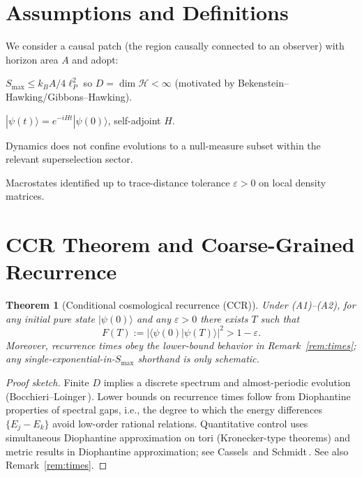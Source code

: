 \documentclass[12pt]{article}
\newcommand{\Smax}{S_{\max}}
\newtheorem{theorem}{Theorem}
\theoremstyle{remark}
\begin{document}
\section{Assumptions and Definitions}
We consider a causal patch (the region causally connected to an observer) with horizon area $A$ and adopt:
\begin{description}[leftmargin=1.5em,labelsep=0.5em]
  \item[(A1) Finite information bound:] $\Smax \leq k_B A/4\ell^2_P$ so $D = \dim \mathcal{H} < \infty$ (motivated by Bekenstein–Hawking/Gibbons–Hawking).
  \item[(A2) Unitary dynamics:] $|\psi(t)\rangle=e^{-iHt}|\psi(0)\rangle$, self-adjoint $H$.
  \item[(A3) Sector mixing (optional):] Dynamics does not confine evolutions to a null-measure subset within the relevant superselection sector.
  \item[(A4) Finite-resolution observers:] Macrostates identified up to trace-distance tolerance $\varepsilon>0$ on local density matrices.
\end{description}

\section{CCR Theorem and Coarse-Grained Recurrence}
\begin{theorem}[Conditional cosmological recurrence (CCR)]\label{thm:CCR}
Under (A1)--(A2), for any initial pure state $|\psi(0)\rangle$ and any $\varepsilon>0$ there exists $T$ such that
\begin{equation}
 F(T):=|\langle\psi(0)|\psi(T)\rangle|^2 > 1-\varepsilon.
\end{equation}
Moreover, recurrence times obey the lower-bound behavior in Remark~\ref{rem:times}; any single-exponential-in-$\Smax$ shorthand is only schematic.
\end{theorem}
\begin{proof}[Proof sketch]
Finite $D$ implies a discrete spectrum and almost-periodic evolution (Bocchieri--Loinger\,\cite{BocchieriLoinger1957}). 
Lower bounds on recurrence times follow from Diophantine properties of spectral gaps, i.e., the degree to which the energy differences $\{E_j{-}E_k\}$ avoid low-order rational relations. Quantitative control uses simultaneous Diophantine approximation on tori (Kronecker-type theorems) and metric results in Diophantine approximation; see Cassels\,\cite{Cassels1957} and Schmidt\,\cite{Schmidt1980}. See also Remark~\ref{rem:times}.
\end{proof}
\end{document}
